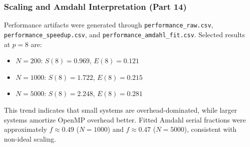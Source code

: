 \subsubsection{Scaling and Amdahl Interpretation (Part 14)}
Performance artifacts were generated through \texttt{performance\_raw.csv}, \texttt{performance\_speedup.csv}, and \texttt{performance\_amdahl\_fit.csv}. Selected results at $p=8$ are:
\begin{itemize}
    \item $N=200$: $S(8)=0.969$, $E(8)=0.121$
    \item $N=1000$: $S(8)=1.722$, $E(8)=0.215$
    \item $N=5000$: $S(8)=2.248$, $E(8)=0.281$
\end{itemize}
This trend indicates that small systems are overhead-dominated, while larger systems amortize OpenMP overhead better. Fitted Amdahl serial fractions were approximately $f\approx0.49$ ($N=1000$) and $f\approx0.47$ ($N=5000$), consistent with non-ideal scaling.
